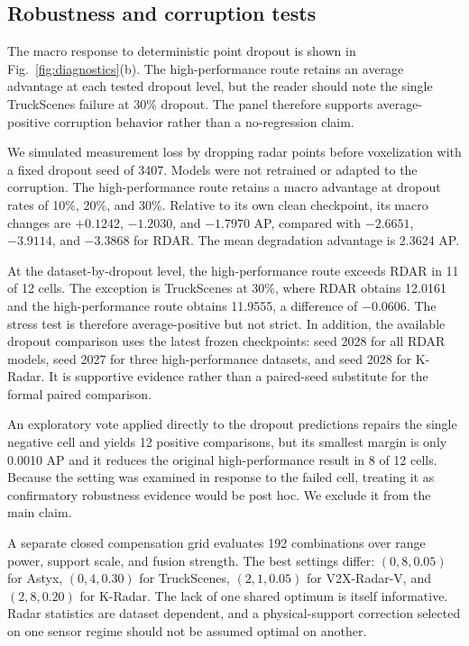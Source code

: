 \documentclass[final,5p,times]{elsarticle}
\newcommand{\figref}[1]{\textcolor{floatreviewblue}{Fig.~\ref{#1}}}
\newcommand{\figref}[1]{Fig.~\ref{#1}}
\begin{document}
\subsection{Robustness and corruption tests}

The macro response to deterministic point dropout is shown in
\figref{fig:diagnostics}(b). The high-performance route retains an average
advantage at each tested dropout level, but the reader should note the single
TruckScenes failure at 30\% dropout. The panel therefore supports
average-positive corruption behavior rather than a no-regression claim.

We simulated measurement loss by dropping radar points before voxelization
with a fixed dropout seed of 3407. Models were not retrained or adapted to the
corruption. The high-performance route retains a macro advantage at dropout
rates of 10\%, 20\%, and 30\%. Relative
to its own clean checkpoint, its macro changes are $+0.1242$, $-1.2030$, and
$-1.7970$ AP, compared with $-2.6651$, $-3.9114$, and $-3.3868$ for RDAR.
The mean degradation advantage is 2.3624 AP.

At the dataset-by-dropout level, the high-performance route exceeds RDAR in 11
of 12 cells. The exception is TruckScenes at 30\%, where RDAR obtains 12.0161
and the high-performance route obtains 11.9555, a difference of $-0.0606$.
The stress test is therefore average-positive but not strict. In addition, the
available dropout comparison uses the latest frozen checkpoints: seed 2028 for
all RDAR models, seed 2027 for three high-performance datasets, and seed 2028
for K-Radar. It is supportive evidence rather than a paired-seed substitute
for the formal paired comparison.

An exploratory vote applied directly to the dropout predictions repairs the
single negative cell and yields 12 positive comparisons, but its smallest
margin is only 0.0010 AP and it reduces the original high-performance result
in 8 of 12 cells. Because the setting was examined in response to the failed
cell, treating it as confirmatory robustness evidence would be post hoc. We
exclude it from the main claim.

A separate closed compensation grid evaluates 192 combinations over range
power, support scale, and fusion strength. The best settings differ:
$(0,8,0.05)$ for Astyx, $(0,4,0.30)$ for TruckScenes,
$(2,1,0.05)$ for V2X-Radar-V, and $(2,8,0.20)$ for K-Radar. The lack of one
shared optimum is itself informative. Radar statistics are dataset dependent,
and a physical-support correction selected on one sensor regime should not be
assumed optimal on another.
\end{document}
